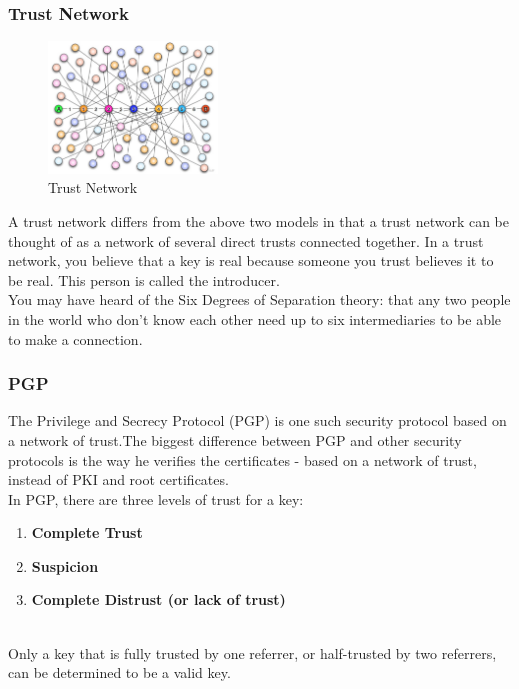 \subsubsection{Trust Network}
\begin{figure}[H] %
    \centering %
    \includegraphics[width=0.4\textwidth]{figures/trustNet.png} %
    \caption{Trust Network} %
    \label{Fig.5: Trust Network} %
    \end{figure}
A trust network differs from the above two models in that a trust network can be 
thought of as a network of several direct trusts connected together. In a trust 
network\cite{b27}, you believe that a key is real because someone you trust believes it to 
be real. This person is called the introducer\cite{b28}.
\\
You may have heard of the Six Degrees of Separation theory\cite{b37}: that any two people 
in the world who don't know each other need up to six intermediaries to be able 
to make a connection\cite{b29}.


\subsubsection{PGP}
The Privilege and Secrecy Protocol (PGP) is one such security protocol based on 
a network of trust\cite{b11}.The biggest difference between PGP and other security protocols 
is the way he verifies the certificates - based on a network of trust, instead of PKI 
and root certificates\cite{b12}.
\\
In PGP, there are three levels of trust for a key:

\begin{enumerate}[]
    \item \textbf{Complete Trust}
    \item \textbf{Suspicion}
    \item \textbf{Complete Distrust (or lack of trust)}
    \end{enumerate}
\\
Only a key that is fully trusted by one referrer, or half-trusted by two referrers, 
can be determined to be a valid key.

